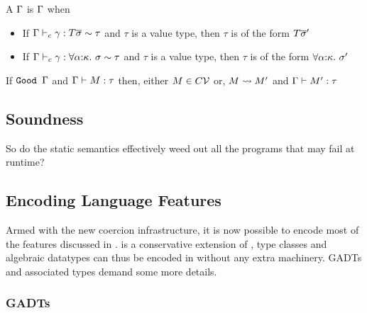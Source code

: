\documentclass[manuscript,screen,nonacm]{acmart}
\begin{document}
\begin{definition}[\Good $\TEnv$]
  A $\TEnv$ is \Good $\TEnv$ when
  \begin{itemize}
  \item If $\Gamma \vdash_{c} \gamma : T \overline{\sigma} \sim \tau$ and $\tau$ is a value type, then $\tau$ is of the form $T\overline{\sigma}'$
  \item If $\Gamma \vdash_{c} \gamma : \forall\alpha{:}\kappa.~\sigma \sim \tau$ and $\tau$ is a value type, then $\tau$ is of the form $\forall\alpha{:}\kappa.~\sigma'$
  \end{itemize}
\end{definition}

\begin{theorem}\label{thm:progress}
  If $\texttt{Good }\Gamma$ and $\Gamma \vdash M : \tau$ then, either $M \in C\mathcal{V}$ or, $M \rightsquigarrow M'$ and
  $\Gamma \vdash M' : \tau$
\end{theorem}


\subsection{Soundness}
So do the static semantics effectively weed out all the programs that may fail at runtime?
  



\subsection{Encoding Language Features}

Armed with the new coercion infrastructure, it is now possible to encode most of the features discussed in . \SFC is a conservative extension of \SF, type classes and algebraic datatypes can thus be encoded in \SFC without any extra machinery. GADTs and associated types demand some more details.

\subsubsection{GADTs}
\end{document}
